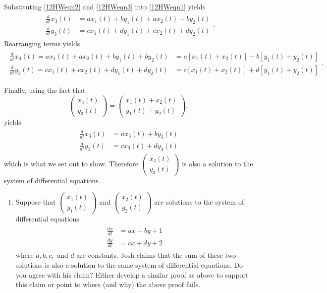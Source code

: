 \begin{enumerate}
Substituting \eqref{12HWeqn2} and \eqref{12HWeqn3} into \eqref{12HWeqn1} yields 
\begin{align*}\begin{split}
\frac{d}{dt}x_3(t)&=ax_1(t)+by_1(t)+ax_2(t)+by_2(t)\\ \frac{d}{dt}y_3(t)&= cx_1(t)+dy_1(t)+cx_2(t)+dy_2(t) 
\end{split}.\end{align*}  
Rearranging terms yields
\begin{align*}\begin{split}
\frac{d}{dt}x_3(t)=ax_1(t)+ax_2(t)+by_1(t)+by_2(t) &= a[x_1(t)+x_2(t)]+b[y_1(t)+y_2(t)] \\ \frac{d}{dt}y_3(t)= cx_1(t)+cx_2(t)+dy_1(t)+dy_2(t) &= c[x_1(t)+x_2(t)]+d[y_1(t)+y_2(t)] 
\end{split}.\end{align*}  


Finally, using the fact that   \[ \begin{pmatrix}
x_3(t)\\y_3(t)\end{pmatrix}=\begin{pmatrix}
x_1(t)+x_2(t)\\y_1(t)+y_2(t)
\end{pmatrix},\]   yields \begin{align*}\begin{split}
\frac{d}{dt}x_3(t)&=ax_3(t)+by_3(t)\\ \frac{d}{dt}y_3(t)&= cx_3(t)+dy_3(t)
\end{split}\end{align*}
   which is what we set out to show. Therefore $\displaystyle  \begin{pmatrix}
x_3(t)\\y_3(t)\end{pmatrix}$  is also a solution to the system of differential equations.

\clearpage

\begin{enumerate}
\item	Suppose that \label{12HWprob7parta} $\displaystyle  \begin{pmatrix}
x_1(t)\\y_1(t)\end{pmatrix}$  and $\displaystyle  \begin{pmatrix}
x_2(t)\\y_2(t)\end{pmatrix}$  are solutions to the system of differential equations
\begin{align*}\begin{split}
\frac{dx}{dt}&=ax+by+1\\ \frac{dy}{dt}&= cx+dy+2
\end{split}\end{align*}
 where $a, b, c,$ and $d$ are constants. Josh claims that the sum of these two solutions is also a solution to the same system of differential equations. Do you agree with his claim? Either develop a similar proof as above to support this claim or point to where (and why) the above proof fails.


\end{enumerate}
\end{enumerate}
